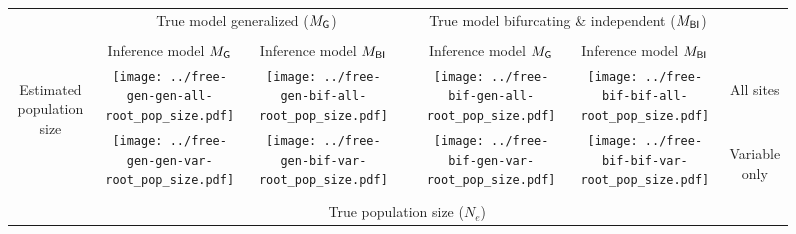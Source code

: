 \documentclass[border=10pt,varwidth=30cm]{standalone}
\newcommand{\genmodel}{\ensuremath{M_{\textrm{\sffamily G}}}\xspace}
\newcommand{\bimodel}{\ensuremath{M_{\textrm{\sffamily BI}}}\xspace}
\begin{document}
\begin{figure}
    \setlength\arrayrulewidth{2pt}
    \centering
    \begin{tabular}{@{}ccccccc@{}}
        & \multicolumn{2}{c}{\LARGE True model generalized (\genmodel)}
        &
        & \multicolumn{2}{c}{\LARGE True model bifurcating \& independent (\bimodel)}
        & \\[1ex]
        \cline{2-3}\cline{5-6}
        & & & & & & \\
        & \multirow{1}{0.19\textwidth}{\centering\Large Inference model \genmodel}
        & \multirow{1}{0.19\textwidth}{\centering\Large Inference model \bimodel}
        &
        & \multirow{1}{0.19\textwidth}{\centering\Large Inference model \genmodel}
        & \multirow{1}{0.19\textwidth}{\centering\Large Inference model \bimodel}
        & \\[4ex]
        \multirow{2}{*}[5em]{\begin{sideways}\Large Estimated population size\end{sideways}}
        & \texttt{[image: ../free-gen-gen-all-root\_pop\_size.pdf]}
        & \texttt{[image: ../free-gen-bif-all-root\_pop\_size.pdf]}
        &
        & \texttt{[image: ../free-bif-gen-all-root\_pop\_size.pdf]}
        & \texttt{[image: ../free-bif-bif-all-root\_pop\_size.pdf]}
        & \multirow{1}{*}[9em]{\begin{sideways}\Large All sites\end{sideways}} \\
        & \texttt{[image: ../free-gen-gen-var-root\_pop\_size.pdf]}
        & \texttt{[image: ../free-gen-bif-var-root\_pop\_size.pdf]}
        &
        & \texttt{[image: ../free-bif-gen-var-root\_pop\_size.pdf]}
        & \texttt{[image: ../free-bif-bif-var-root\_pop\_size.pdf]}
        & \multirow{1}{*}[10em]{\begin{sideways}\Large Variable only\end{sideways}} \\
        & \multicolumn{5}{c}{\Large True population size ($N_e$)} & \\
    \end{tabular}
\end{figure}
\end{document}
